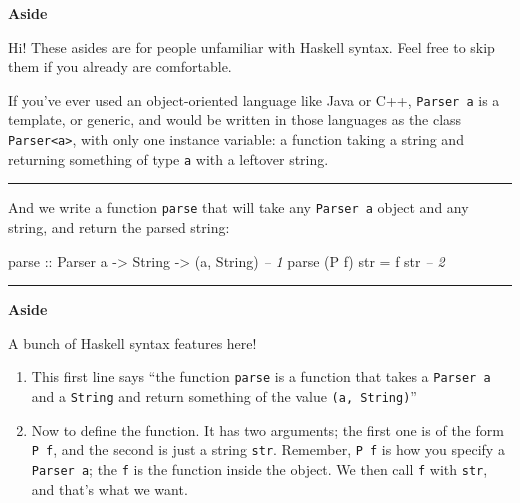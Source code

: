 \documentclass[]{article}
\newenvironment{Shaded}{}{}
\newcommand{\CommentTok}[1]{\textcolor[rgb]{0.38,0.63,0.69}{\textit{#1}}}
\newcommand{\DataTypeTok}[1]{\textcolor[rgb]{0.56,0.13,0.00}{#1}}
\newcommand{\FunctionTok}[1]{\textcolor[rgb]{0.02,0.16,0.49}{#1}}
\newcommand{\NormalTok}[1]{#1}
\newcommand{\OtherTok}[1]{\textcolor[rgb]{0.00,0.44,0.13}{#1}}
\begin{document}
\textbf{Aside}

Hi! These asides are for people unfamiliar with Haskell syntax. Feel free to
skip them if you already are comfortable.

If you've ever used an object-oriented language like Java or C++,
\texttt{Parser\ a} is a template, or generic, and would be written in those
languages as the class \texttt{Parser\textless{}a\textgreater{}}, with only one
instance variable: a function taking a string and returning something of type
\texttt{a} with a leftover string.

\begin{center}\rule{0.5\linewidth}{\linethickness}\end{center}

And we write a function \texttt{parse} that will take any \texttt{Parser\ a}
object and any string, and return the parsed string:

\begin{Shaded}
\begin{Highlighting}[]
\OtherTok{parse ::} \DataTypeTok{Parser}\NormalTok{ a }\OtherTok{->} \DataTypeTok{String} \OtherTok{->}\NormalTok{ (a, }\DataTypeTok{String}\NormalTok{)              }\CommentTok{-- 1}
\NormalTok{parse (}\DataTypeTok{P}\NormalTok{ f) str }\FunctionTok{=}\NormalTok{ f str                                 }\CommentTok{-- 2}
\end{Highlighting}
\end{Shaded}

\begin{center}\rule{0.5\linewidth}{\linethickness}\end{center}

\textbf{Aside}

A bunch of Haskell syntax features here!

\begin{enumerate}
\def\labelenumi{\arabic{enumi}.}
\item
  This first line says ``the function \texttt{parse} is a function that takes a
  \texttt{Parser\ a} and a \texttt{String} and return something of the value
  \texttt{(a,\ String)}''
\item
  Now to define the function. It has two arguments; the first one is of the form
  \texttt{P\ f}, and the second is just a string \texttt{str}. Remember,
  \texttt{P\ f} is how you specify a \texttt{Parser\ a}; the \texttt{f} is the
  function inside the object. We then call \texttt{f} with \texttt{str}, and
  that's what we want.
\end{enumerate}
\end{document}
